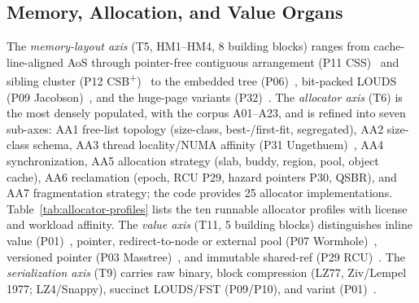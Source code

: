 \subsection{Memory, Allocation, and Value Organs}\label{ssec:sota-ax-mem}
The \emph{memory-layout axis} (T5, HM1--HM4, 8 building blocks) ranges from cache-line-aligned AoS
through pointer-free contiguous arrangement (P11 CSS)~\cite{rao1999css} and sibling cluster (P12
CSB\textsuperscript{+})~\cite{rao2000csb} to the embedded tree (P06)~\cite{schmeisser2022b2tree},
bit-packed LOUDS (P09 Jacobson)~\cite{jacobson1989louds}, and the huge-page variants
(P32)~\cite{schmidt2025hbm}. The \emph{allocator axis} (T6) is the most densely populated, with the
corpus A01--A23, and is refined into seven sub-axes: AA1 free-list topology (size-class,
best-/first-fit, segregated), AA2 size-class schema, AA3 thread locality/NUMA affinity (P31
Ungethuem)~\cite{ungethuem2017survey}, AA4 synchronization, AA5 allocation strategy (slab, buddy,
region, pool, object cache), AA6 reclamation (epoch, RCU P29, hazard pointers P30, QSBR), and AA7
fragmentation strategy; the code provides 25 allocator implementations. Table~\ref{tab:allocator-profiles} lists the ten runnable
allocator profiles with license and workload affinity. The \emph{value axis} (T11, 5 building
blocks) distinguishes inline value (P01)~\cite{leis2013art}, pointer, redirect-to-node or external
pool (P07 Wormhole)~\cite{wu2019wormhole}, versioned pointer (P03 Masstree)~\cite{mao2012masstree},
and immutable shared-ref (P29 RCU)~\cite{mckenney2001rcu}. The \emph{serialization axis} (T9)
carries raw binary, block compression (LZ77, Ziv/Lempel 1977; LZ4/Snappy), succinct LOUDS/FST
(P09/P10), and varint (P01)~\cite{leis2013art}.

